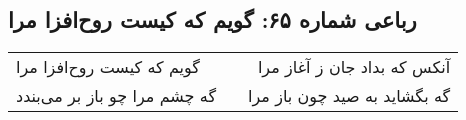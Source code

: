 \begin{center}
\section*{رباعی شماره ۶۵: گویم که کیست روح‌افزا مرا}
\label{sec:0065}
\begin{longtable}{l p{0.5cm} r}
گویم که کیست روح‌افزا مرا
&&
آنکس که بداد جان ز آغاز مرا
\\
گه چشم مرا چو باز بر می‌بندد
&&
گه بگشاید به صید چون باز مرا
\\
\end{longtable}
\end{center}
